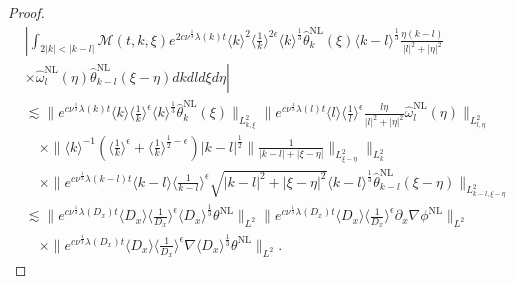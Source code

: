 \documentclass[reqno, 12pt]{amsart} %
\theoremstyle{plain} %
\theoremstyle{definition}
\theoremstyle{remark}
\numberwithin{equation}{section} %
\newcommand{\no}{\nonumber}
\newcommand{\lt}{\left}
\newcommand{\rt}{\right}
\newcommand{\px}{\partial_x}
\begin{document}
\begin{proof}
\begin{align}
			& \no \left| \int_{2|k| <|k-l| } \mathcal{M}(t, k, \xi) e^{2 c \nu^{\frac{1}{3}} \lambda(k) t}\langle k\rangle^2\langle\frac{1}{k}\rangle^{2 \epsilon} \langle k \rangle^\frac13\hat{\theta}_k^{\mathrm{NL}}(\xi) \langle k-l \rangle^\frac13  \frac{\eta(k-l)}{|l|^2+|\eta|^2}\right. \\
			& \lt. \no\times \hat{\omega}_l^{\mathrm{NL}}(\eta) \hat{\theta}_{k-l}^{\mathrm{NL}}(\xi-\eta) d k d l d \xi d \eta \rt| \\
			&\no \lesssim\|e^{c \nu^{\frac{1}{3}} \lambda(k) t}  \langle k \rangle \langle \frac1k \rangle^\epsilon \langle k \rangle^\frac13  \hat{\theta}_k^{\mathrm{NL}}(\xi)\|_{L_{k, \xi}^2}\|e^{c \nu^{\frac{1}{3}} \lambda(l) t}\langle l\rangle\langle\frac{1}{l}\rangle^\epsilon   \frac{l\eta}{|l|^2  + |\eta|^2} \hat{\omega}_l^{\mathrm{NL}}(\eta)\|_{L_{l, \eta}^2}         \\
			& \no\quad \times \|\langle k\rangle^{-1}   (\langle \frac1k \rangle^\epsilon  + \langle \frac1k \rangle^{\frac12-\epsilon}) |k-l|^\frac12   \| \frac{1}{|k-l| + |\xi - \eta|} \|_{L_{\xi - \eta}^2} \|_{L_{k}^2}  \\
			& \no\quad \times  \|e^{c \nu^{\frac{1}{3}} \lambda(k-l) t}\langle k-l \rangle  \langle \frac{1}{k-l} \rangle^\epsilon   \sqrt{|k-l|^2 + |\xi - \eta|^2 }\langle k-l \rangle ^\frac13  \hat{\theta}_{k-l}^{\mathrm{NL}}(\xi-\eta)\|_{L_{k-l, \xi-\eta}^2} \\
			& \no\lesssim\|e^{c \nu^{\frac{1}{3}} \lambda\left(D_x\right) t}\langle D_x\rangle    \langle \frac{1}{D_x}\rangle^\epsilon  \langle D_x \rangle^{\frac{1}{3}} \theta^{\mathrm{NL}}\|_{L^2} \|e^{c \nu^{\frac{1}{3}} \lambda\left(D_x\right) t}\langle D_x\rangle\langle\frac{1}{D_x}\rangle^\epsilon \px \nabla \phi^{\mathrm{NL}}\|_{L^2} \\
			& \quad \times\|e^{c \nu^{\frac{1}{3}} \lambda\left(D_x\right) t}\langle D_x\rangle\langle\frac{1}{D_x}\rangle^\epsilon \nabla \langle D_x \rangle^{\frac{1}{3}} \theta^{\mathrm{NL}}\|_{L^2} .
		\end{align}
		

\end{proof}
\end{document}
